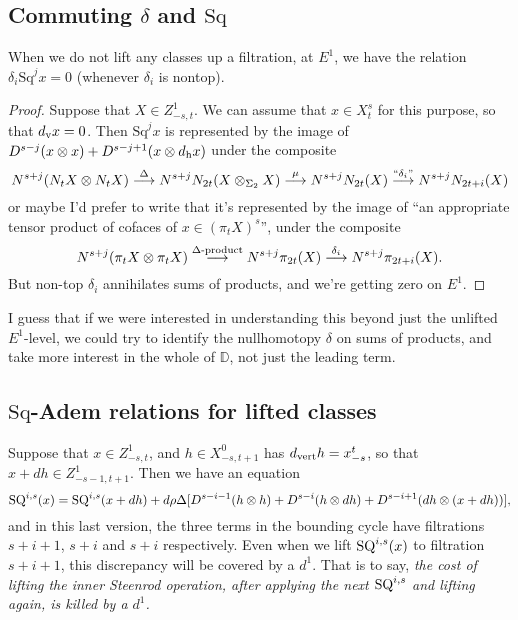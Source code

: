 \documentclass[10pt]{article}
\newcommand{\Sq}{\mathrm{Sq}}
\begin{document}
\begin{AdamsSSEQ operations final}
\subsection{Commuting $\delta$ and $\Sq$}
When we do not lift any classes up a filtration, at $E^1$, we have the relation $\delta_i\Sq^jx=0$ (whenever $\delta_i$ is nontop).
\begin{proof}
Suppose that $X\in Z^1_{-s,t}$. We can assume that $x\in X^s_t$ for this purpose, so that $d_\textup{v}x=0$. Then $\Sq^jx$ is represented by the image of $D^{s-j}(x\otimes x)+D^{s-j+1}(x\otimes d_\textup{h}x)$ under the composite
\[N^{s+j}(N_tX\otimes N_tX)\overset{\Delta}{\to}N^{s+j}N_{2t}(X\otimes_{\Sigma_2} X)\overset{\mu}{\to}N^{s+j}N_{2t}(X)\overset{\textup{``$\delta_i$''}}{\to}N^{s+j}N_{2t+i}(X)\]
or maybe I'd prefer to write that it's represented by the image of ``an appropriate tensor product of cofaces of $x\in (\pi_tX)^s$'', under the composite
\[N^{s+j}(\pi_tX\otimes \pi_tX)\overset{\Delta\textup{-product}}{\to}N^{s+j}\pi_{2t}(X)\overset{\delta_i}{\to}N^{s+j}\pi_{2t+i}(X).\]
But non-top $\delta_i$ annihilates sums of products, and we're getting zero on $E^1$.
\end{proof}
I guess that if we were interested in understanding this beyond just the unlifted $E^1$-level, we could try to identify the nullhomotopy $\delta$ on sums of products, and take more interest in the whole of $\mathbb{D}$, not just the leading term.

\subsection{$\Sq$-Adem relations for lifted classes}
Suppose that $x\in Z^1_{-s,t}$, and $h\in X^0_{-s,t+1}$ has $d_\textup{vert}h=x_{-s}^t$, so that $x+dh\in Z^{1}_{-s-1,t+1}$.
Then we have an equation 
\[\textup{SQ}^{i,s}(x)=\textup{SQ}^{i,s}(x+dh)+d\rho\Delta [D^{s-i-1}(h\otimes h)+D^{s-i}(h\otimes dh)+D^{s-i+1}(dh\otimes (x+dh))],\]
and in this last version, the three terms in the bounding cycle have filtrations $s+i+1$, $s+i$ and $s+i$ respectively. Even when we lift $\textup{SQ}^{i,s}(x)$ to filtration $s+i+1$, this discrepancy will be covered by a $d^1$. That is to say, \emph{the cost of lifting the inner Steenrod operation, after applying the next $\textup{SQ}^{i,s}$ and lifting again, is killed by a $d^1$.}


\end{AdamsSSEQ operations final}
\end{document}
